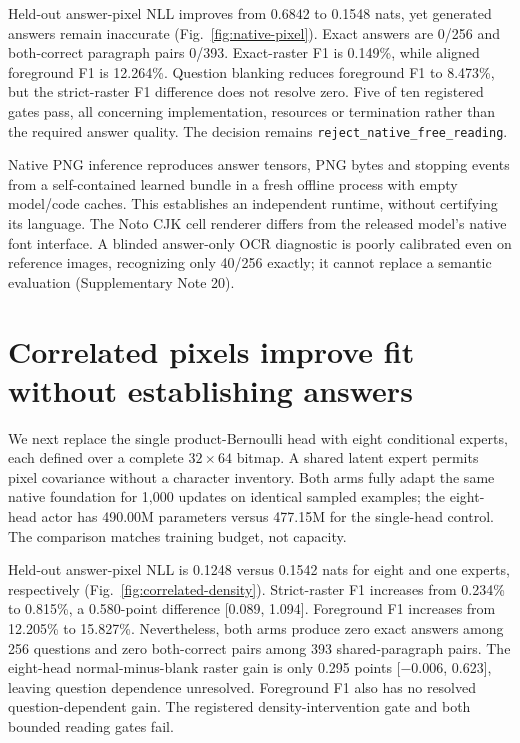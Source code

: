 \documentclass[12pt,a4paper]{article}
\begin{document}
Held-out answer-pixel NLL improves from 0.6842 to 0.1548 nats, yet generated
answers remain inaccurate (Fig.~\ref{fig:native-pixel}). Exact answers are
0/256 and both-correct paragraph pairs 0/393. Exact-raster F1 is 0.149\%,
while aligned foreground F1 is 12.264\%. Question blanking reduces foreground
F1 to 8.473\%, but the strict-raster F1 difference does not resolve zero.
Five of ten registered gates pass, all concerning implementation, resources
or termination rather than the required answer quality. The decision remains
\texttt{reject\_native\_free\_reading}.

Native PNG inference reproduces answer tensors, PNG bytes and stopping events
from a self-contained learned bundle in a fresh offline process with empty
model/code caches. This establishes an independent runtime, without certifying
its language. The Noto CJK cell renderer differs from the released model's
native font interface. A blinded answer-only OCR diagnostic is poorly
calibrated even on reference images, recognizing only 40/256 exactly; it
cannot replace a semantic evaluation (Supplementary Note 20).


\section*{Correlated pixels improve fit without establishing answers}
We next replace the single product-Bernoulli head with eight conditional
experts, each defined over a complete $32\times64$ bitmap. A shared latent
expert permits pixel covariance without a character inventory. Both arms
fully adapt the same native foundation for 1,000 updates on identical sampled
examples; the eight-head actor has 490.00M parameters versus 477.15M for the
single-head control. The comparison matches training budget, not capacity.

Held-out answer-pixel NLL is 0.1248 versus 0.1542 nats for eight and one
experts, respectively (Fig.~\ref{fig:correlated-density}). Strict-raster F1
increases from 0.234\% to 0.815\%, a 0.580-point difference [0.089, 1.094].
Foreground F1 increases from 12.205\% to 15.827\%. Nevertheless, both arms
produce zero exact answers among 256 questions and zero both-correct pairs
among 393 shared-paragraph pairs. The eight-head normal-minus-blank raster
gain is only 0.295 points [$-0.006$, 0.623], leaving question dependence
unresolved. Foreground F1 also has no resolved question-dependent gain.
The registered density-intervention gate and both bounded reading gates fail.
\end{document}
